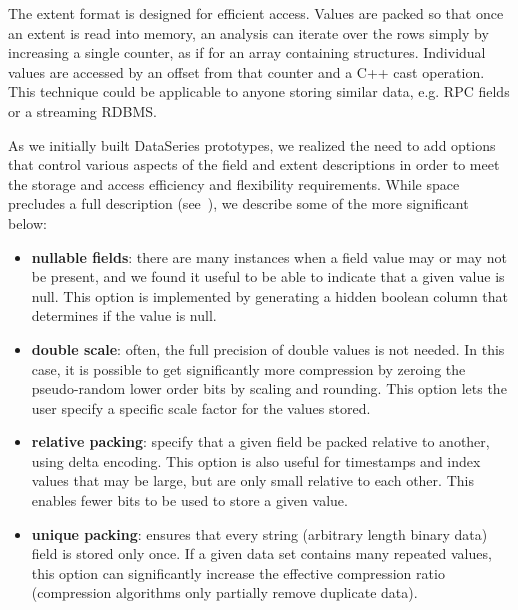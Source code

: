 \documentclass{acm_proc_article-sp}
\begin{document}
The extent format is designed for efficient access. Values are packed
so that once an extent is read into memory, an analysis can iterate
over the rows simply by increasing a single counter, as if for an
array containing structures.  Individual values are accessed by an
offset from that counter and a C++ cast operation. This technique
could be applicable to anyone storing similar data, e.g. RPC fields or
a streaming RDBMS.

As we initially built DataSeries prototypes, we realized the need to
add options that control various aspects of the field and extent
descriptions in order to meet the storage and access efficiency and
flexibility requirements.  While space precludes a full description
(see~\cite{DSTechnicalReportSnapshot}), we describe some of the more
significant below:


\begin{itemize}

\item \textbf{nullable fields}: there are many instances when a field
value may or may not be present, and we found it useful to be able to
indicate that a given value is null. This option is implemented by
generating a hidden boolean column that determines if the value is null.

\item \textbf{double scale}: often, the full precision of double
values is not needed. In this case, it is possible to get
significantly more compression by zeroing the pseudo-random lower
order bits by scaling and rounding. This option lets the user specify
a specific scale factor for the values stored.

\item \textbf{relative packing}: specify that a given field be packed
relative to another, using delta encoding. This option is also useful
for timestamps and index values that may be large, but are only small
relative to each other. This enables fewer bits to be used to store a
given value.

\item \textbf{unique packing}: ensures that every string (arbitrary
length binary data) field is stored only once. If a given data set
contains many repeated values, this option can significantly increase
the effective compression ratio (compression algorithms only partially
remove duplicate data).

\end{itemize}
\end{document}
